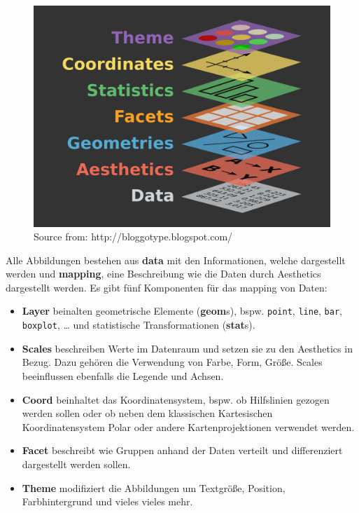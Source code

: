 \documentclass[
]{article}
\providecommand{\tightlist}{%
  \setlength{\itemsep}{0pt}\setlength{\parskip}{0pt}}
\begin{document}
\begin{figure}

{\centering \includegraphics[width=1\linewidth]{images/051} 

}

\caption{Source from: http://bloggotype.blogspot.com/}\label{fig:unnamed-chunk-171}
\end{figure}

Alle Abbildungen bestehen aus \textbf{data} mit den Informationen, welche dargestellt werden und \textbf{mapping}, eine Beschreibung wie die Daten durch Aesthetics dargestellt werden. Es gibt fünf Komponenten für das mapping von Daten:

\begin{itemize}
\tightlist
\item
  \textbf{Layer} beinalten geometrische Elemente (\textbf{geom}s), bspw. \texttt{point}, \texttt{line}, \texttt{bar}, \texttt{boxplot}, \ldots{} und statistische Transformationen (\textbf{stat}s).
\item
  \textbf{Scales} beschreiben Werte im Datenraum und setzen sie zu den Aesthetics in Bezug. Dazu gehören die Verwendung von Farbe, Form, Größe. Scales beeinflussen ebenfalls die Legende und Achsen.
\item
  \textbf{Coord} beinhaltet das Koordinatensystem, bspw. ob Hilfslinien gezogen werden sollen oder ob neben dem klassischen Kartesischen Koordinatensystem Polar oder andere Kartenprojektionen verwendet werden.
\item
  \textbf{Facet} beschreibt wie Gruppen anhand der Daten verteilt und differenziert dargestellt werden sollen.
\item
  \textbf{Theme} modifiziert die Abbildungen um Textgröße, Position, Farbhintergrund und vieles vieles mehr.
\end{itemize}
\end{document}
